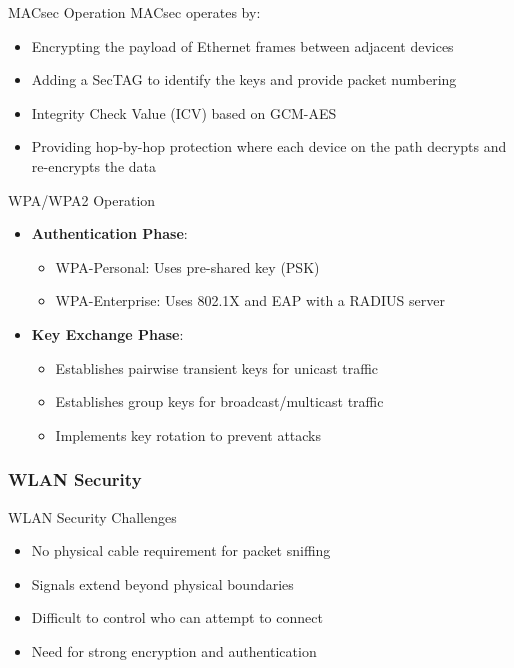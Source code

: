 \begin{concept}{MACsec Operation}
MACsec operates by:
\begin{itemize}
    \item Encrypting the payload of Ethernet frames between adjacent devices
    \item Adding a SecTAG to identify the keys and provide packet numbering
    \item Integrity Check Value (ICV) based on GCM-AES
    \item Providing hop-by-hop protection where each device on the path decrypts and re-encrypts the data
\end{itemize}
\end{concept}

\begin{concept}{WPA/WPA2 Operation}
\begin{itemize}
    \item \textbf{Authentication Phase}:
    \begin{itemize}
        \item WPA-Personal: Uses pre-shared key (PSK)
        \item WPA-Enterprise: Uses 802.1X and EAP with a RADIUS server
    \end{itemize}
    \item \textbf{Key Exchange Phase}:
    \begin{itemize}
        \item Establishes pairwise transient keys for unicast traffic
        \item Establishes group keys for broadcast/multicast traffic
        \item Implements key rotation to prevent attacks
    \end{itemize}
\end{itemize}
\end{concept}


\subsubsection{WLAN Security}

\begin{definition}{WLAN Security Challenges}
\begin{itemize}
    \item No physical cable requirement for packet sniffing
    \item Signals extend beyond physical boundaries
    \item Difficult to control who can attempt to connect
    \item Need for strong encryption and authentication
\end{itemize}
\end{definition}


